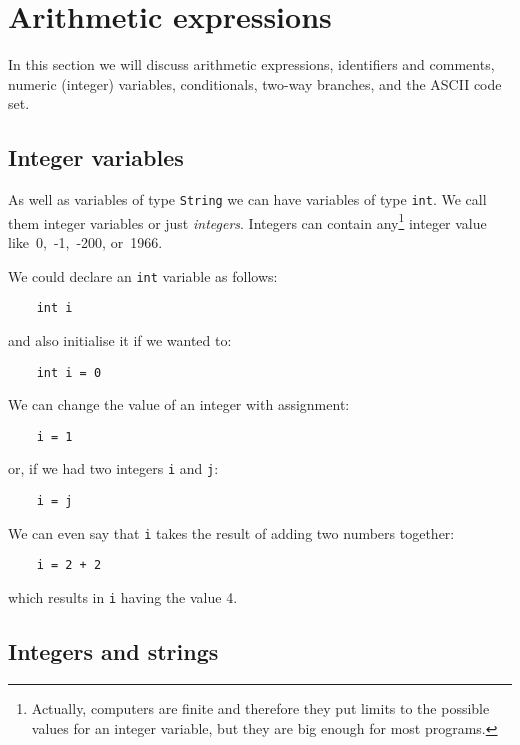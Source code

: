 \section{Arithmetic expressions}

In this section we will discuss arithmetic expressions, identifiers
and comments, numeric (integer) variables, conditionals, two-way
branches, and the ASCII code set.

\subsection{Integer variables}

As well as variables of type \verb!String! we can have variables of
type \verb!int!. We call them integer variables or just
\emph{integers}. Integers can contain any\footnote{Actually, computers
  are finite and therefore they put limits to the possible values for an
  integer variable, but they are big enough for most programs.}
integer value like~0,~-1,~-200, or~1966.

We could declare an \verb!int! variable as follows:

\begin{Verbatim}
    int i
\end{Verbatim}

and also initialise it if we wanted to:

\begin{Verbatim}
    int i = 0
\end{Verbatim}

We can change the value of an integer with assignment:

\begin{Verbatim}
    i = 1
\end{Verbatim}

or, if we had two integers \verb!i! and \verb!j!:

\begin{Verbatim}
    i = j
\end{Verbatim}

We can even say that \verb.i. takes the result of adding two numbers
together:

\begin{Verbatim}
    i = 2 + 2
\end{Verbatim}

which results in \verb.i. having the value 4. 

\subsection*{Integers and strings}
\label{sec:intstr}

